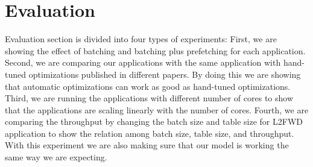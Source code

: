 \section{Evaluation}
\label{evaluation}
Evaluation section is divided into four types of experiments: First, we are showing the effect of batching and batching plus prefetching for each application. Second, we are comparing our applications with the same application with hand-tuned optimizations published in different papers. By doing this we are showing that automatic optimizations can work as good as hand-tuned optimizations. Third, we are running the applications with different number of cores to show that the applications are scaling linearly with the number of cores. Fourth, we are comparing the throughput by changing the batch size and table size for L2FWD application to show the relation among batch size, table size, and throughput. With this experiment we are also making sure that our model is working the same way we are expecting.

